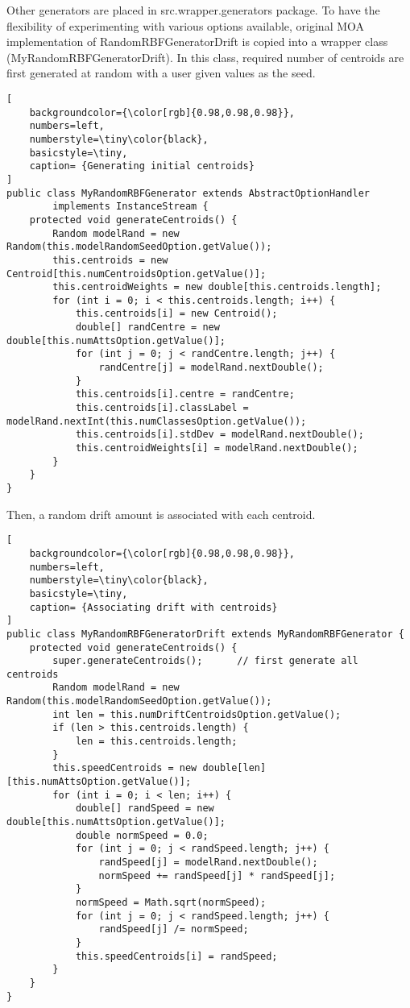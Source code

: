Other generators are placed in src.wrapper.generators package.  To have the flexibility of experimenting with various options available, original MOA implementation of RandomRBFGeneratorDrift is copied into a wrapper class (MyRandomRBFGeneratorDrift). In this class, required number of centroids are first generated at random with a user given values as the seed.
\begin{lstlisting}[
    backgroundcolor={\color[rgb]{0.98,0.98,0.98}},
    numbers=left,
    numberstyle=\tiny\color{black},
    basicstyle=\tiny,
    caption= {Generating initial centroids}
]
public class MyRandomRBFGenerator extends AbstractOptionHandler 
        implements InstanceStream {
    protected void generateCentroids() {
        Random modelRand = new Random(this.modelRandomSeedOption.getValue());
        this.centroids = new Centroid[this.numCentroidsOption.getValue()];
        this.centroidWeights = new double[this.centroids.length];
        for (int i = 0; i < this.centroids.length; i++) {
            this.centroids[i] = new Centroid();
            double[] randCentre = new double[this.numAttsOption.getValue()];
            for (int j = 0; j < randCentre.length; j++) {
                randCentre[j] = modelRand.nextDouble();
            }
            this.centroids[i].centre = randCentre;
            this.centroids[i].classLabel = modelRand.nextInt(this.numClassesOption.getValue());
            this.centroids[i].stdDev = modelRand.nextDouble();
            this.centroidWeights[i] = modelRand.nextDouble();
        }
    }
}
\end{lstlisting}
Then, a random drift amount is associated with each centroid.
\begin{lstlisting}[
    backgroundcolor={\color[rgb]{0.98,0.98,0.98}},
    numbers=left,
    numberstyle=\tiny\color{black},
    basicstyle=\tiny,
    caption= {Associating drift with centroids}
]
public class MyRandomRBFGeneratorDrift extends MyRandomRBFGenerator {
    protected void generateCentroids() {
        super.generateCentroids();		// first generate all centroids
        Random modelRand = new Random(this.modelRandomSeedOption.getValue());
        int len = this.numDriftCentroidsOption.getValue();
        if (len > this.centroids.length) {
            len = this.centroids.length;
        }
        this.speedCentroids = new double[len][this.numAttsOption.getValue()];
        for (int i = 0; i < len; i++) {
            double[] randSpeed = new double[this.numAttsOption.getValue()];
            double normSpeed = 0.0;
            for (int j = 0; j < randSpeed.length; j++) {
                randSpeed[j] = modelRand.nextDouble();
                normSpeed += randSpeed[j] * randSpeed[j];
            }
            normSpeed = Math.sqrt(normSpeed);
            for (int j = 0; j < randSpeed.length; j++) {
                randSpeed[j] /= normSpeed;
            }
            this.speedCentroids[i] = randSpeed;
        }
    }
}
\end{lstlisting}
